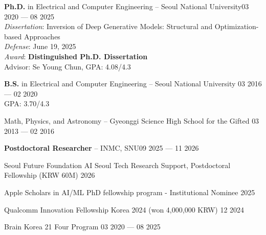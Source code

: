 \begin{cvcontent}
\textbf{Ph.D.} in Electrical and Computer Engineering -- {Seoul National University}\hfill {03 2020 --- 08 2025}\\
\textit{Dissertation}: Inversion of Deep Generative Models: Structural and Optimization-based Approaches\\
\textit{Defense}: June 19, 2025\\
\textit{Award}: \textbf{Distinguished Ph.D. Dissertation}\\
Advisor: Se Young Chun, GPA: 4.08/4.3

\textbf{B.S.} in Electrical and Computer Engineering -- {Seoul National University}  \hfill {03 2016 --- 02 2020}\\
GPA: 3.70/4.3

Math, Physics, and Astronomy -- {Gyeonggi Science High School for the Gifted} \hfill {03 2013 --- 02 2016}

\end{cvcontent}
\begin{cvcontent}
\textbf{Postdoctoral Researcher} -- {INMC, SNU}\hfill {09 2025 --- 11 2026}

\end{cvcontent}
\begin{cvcontent}
Seoul Future Foundation AI Seoul Tech Research Support, Postdoctoral Fellowship (KRW 60M) \hfill 2026

Apple Scholars in AI/ML PhD fellowship program - Institutional Nominee \hfill 2025

Qualcomm Innovation Fellowship Korea 2024 (won 4,000,000 KRW) \hfill 12 2024

Brain Korea 21 Four Program \hfill 03 2020 --- 08 2025\\

\end{cvcontent}
